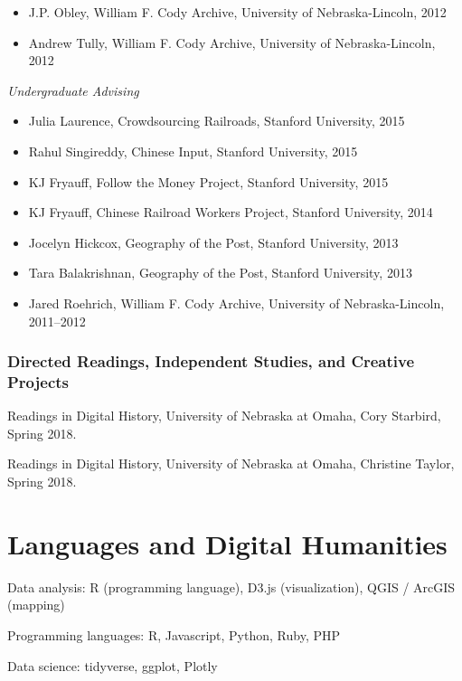 \begin{itemize}
\tightlist
\item
  J.P. Obley, William F. Cody Archive, University of Nebraska-Lincoln,
  2012
\item
  Andrew Tully, William F. Cody Archive, University of Nebraska-Lincoln,
  2012
\end{itemize}

\emph{Undergraduate Advising}

\begin{itemize}
\tightlist
\item
  Julia Laurence, Crowdsourcing Railroads, Stanford University, 2015
\item
  Rahul Singireddy, Chinese Input, Stanford University, 2015
\item
  KJ Fryauff, Follow the Money Project, Stanford University, 2015
\item
  KJ Fryauff, Chinese Railroad Workers Project, Stanford University,
  2014
\item
  Jocelyn Hickcox, Geography of the Post, Stanford University, 2013
\item
  Tara Balakrishnan, Geography of the Post, Stanford University, 2013
\item
  Jared Roehrich, William F. Cody Archive, University of
  Nebraska-Lincoln, 2011--2012
\end{itemize}

\subsubsection{Directed Readings, Independent Studies, and Creative
Projects}\label{directed-readings-independent-studies-and-creative-projects}

Readings in Digital History, University of Nebraska at Omaha, Cory
Starbird, Spring 2018.

Readings in Digital History, University of Nebraska at Omaha, Christine
Taylor, Spring 2018.

\section{Languages and Digital
Humanities}\label{languages-and-digital-humanities}

Data analysis: R (programming language), D3.js (visualization), QGIS /
ArcGIS (mapping)

Programming languages: R, Javascript, Python, Ruby, PHP

Data science: tidyverse, ggplot, Plotly


